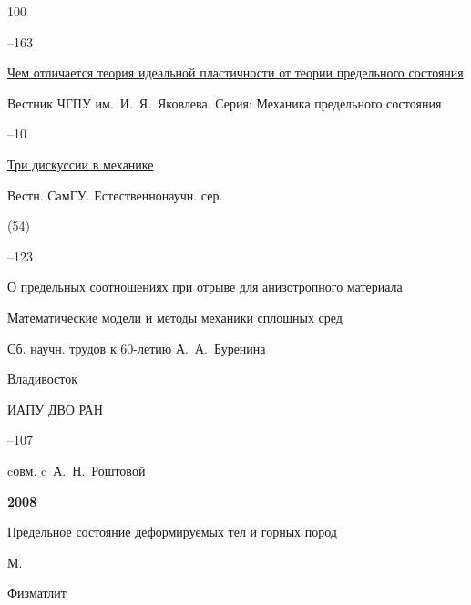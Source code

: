 \begin{thebibliography}{100}


--163






\paper \href{http://elibrary.ru/item.asp?id=13411253}{Чем отличается теория идеальной пластичности от теории предельного состояния}

\jour Вестник ЧГПУ им.~И.~Я.~Яковлева. Серия: Механика предельного состояния



--10






\paper \href{http://elibrary.ru/item.asp?id=9505064}{Три дискуссии в механике}

\jour Вестн. СамГУ. Естественнонаучн. сер.


(54)

--123




\paper О предельных соотношениях при отрыве для анизотропного материала 

\inbook Математические модели и методы механики сплошных сред

\bookinfo Сб. научн. трудов к 60-летию А.~А.~Буренина

\publaddr Владивосток

\publ ИАПУ ДВО РАН


--107 

\miscnote cовм. c~А.~Н.~Роштовой



\item[] \centerline{\bf 2008}




\book \href{http://elibrary.ru/item.asp?id=15211502}{Предельное состояние деформируемых тел и горных пород}

\publaddr М.

\publ Физматлит


\end{thebibliography}
